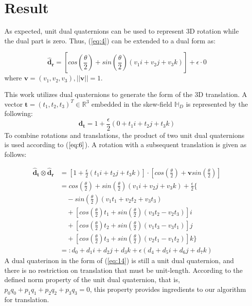 \documentclass[micromachines,article,accept,pdftex,moreauthors]{Definitions/mdpi}
\begin{document}

\section{Result} \label{4}

As expected, unit dual quaternions can be used to represent 3D rotation while the dual part is zero. Thus, (\ref{eq:4}) can be extended to a dual form as:

\begin{equation} \label{eq:12}
\boldsymbol{\widehat{d}_{r}} = [cos({\frac{\theta}{2}}) + sin({\frac{\theta}{2}})(v_1 i + v_2 j + v_3 k)] + \epsilon \cdot 0
\end{equation}
where $\boldsymbol{v} = (v_1, v_2, v_3), ||\boldsymbol{v}|| = 1$.

This work utilizes dual quaternions to generate the form of the 3D translation. A vector $\boldsymbol{t} = (t_1,t_2,t_3)^T \in \mathbb{R}^3$ embedded in the skew-field $\mathbb{H}_D$ is represented by the following:
\begin{equation} \label{eq:13}
    \boldsymbol{\widehat{d}_{t}} = 1 + {\frac{\epsilon}{2}(0 + t_1 i + t_2 j + t_3 k)}
\end{equation}
To combine rotations and translations, the product of two unit dual quaternions is used according to ($\ref{eq:6}$). A rotation with a subsequent translation is given as follows:

\begin{equation} \label{eq:14}
\begin{split}
\boldsymbol{\widehat{d}_{t}} \otimes \boldsymbol{\widehat{d}_{r}} & =[{1+{\frac{\epsilon}{2}}(t_1 i + t_2 j + t_3 k)}] \cdot [{cos({\frac{\theta}{2}}) + \boldsymbol{v}sin({\frac{\theta}{2}})}] \\
& = cos({\frac{\theta}{2}})+sin({\frac{\theta}{2}})(v_1 i + v_2 j + v_3 k)+ {\frac{\epsilon}{2}}{\{} \\
&\quad - sin(\frac{\theta}{2})({v_1}{t_1} + {v_2}{t_2} + {v_3}{t_3}) \\
&\quad + [cos(\frac{\theta}{2})t_1 + sin(\frac{\theta}{2})({v_3}{t_2} - {v_2}{t_3})]i \\
&\quad + [cos(\frac{\theta}{2}){t_2} + sin(\frac{\theta}{2})({v_1}{t_3}-{v_3}{t_1})]j \\
&\quad +[cos(\frac{\theta}{2})t_3 + sin(\frac{\theta}{2})({v_2}t_1  - {v_1}t_2)]k {\}} \\
& =: {d_0} + {d_1}{i} + {d_2}{j} + {d_3}k + {\epsilon}({d_4} + {d_5}i + {d_6}j + {d_7}k)
\end{split} 
\end{equation}
A dual quaterinon in the form of (\ref{eq:14}) is still a unit dual quaternion, and there is no restriction on translation that must be unit-length. According to the defined norm property of the unit dual quaternion, that is, ${p_0}{q_0} + {p_1}{q_1} + {p_2}{q_2}+{p_3}{q_3} = 0$, this property provides ingredients to our algorithm for translation.
\end{document}
